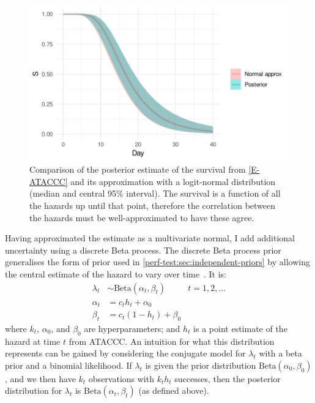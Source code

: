 \documentclass[thesis.tex]{subfiles}
\begin{document}
\begin{figure}
  \centering \includegraphics{cis-perfect-testing/ataccc-approximation-survival}
  \caption[Approximating the ATACCC posterior survival as a logit-normal]{Comparison of the posterior estimate of the survival from \cref{E-ATACCC} and its approximation with a logit-normal distribution (median and central 95\% interval). The survival is a function of all the hazards up until that point, therefore the correlation between the hazards must be well-approximated to have these agree. \label{perf-test:fig:approximate-ATACCC-survival}}
\end{figure}

Having approximated the estimate as a multivariate normal, I add additional uncertainty using a discrete Beta process.
The discrete Beta process prior generalises the form of prior used in \cref{perf-test:sec:independent-priors} by allowing the central estimate of the hazard to vary over time~\autocites{ibrahimBayesian}{sunStatisticala}.
It is:
\begin{align}
  \lambda_t &\sim \text{Beta}(\alpha_t, \beta_t) &t = 1, 2, \dots \\
  \alpha_t &= c_t h_t + \alpha_0 \\
  \beta_t &= c_t (1 - h_t) + \beta_0
\end{align}
where $k_t$, $\alpha_0$, and $\beta_0$ are hyperparameters; and $h_t$ is a point estimate of the hazard at time $t$ from ATACCC.
An intuition for what this distribution represents can be gained by considering the conjugate model for $\lambda_t$ with a beta prior and a binomial likelihood.
If $\lambda_t$ is given the prior distribution $\text{Beta}(\alpha_0, \beta_0)$, and we then have $k_t$ observations with $k_t h_t$ successes, then the posterior distribution for $\lambda_t$ is $\text{Beta}(\alpha_t, \beta_t)$ (as defined above).
\end{document}
